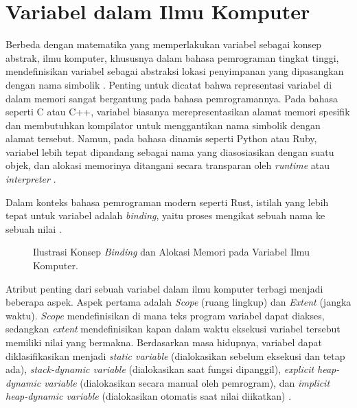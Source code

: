 \documentclass[11pt,a4paper]{article}
\begin{document}
\section{Variabel dalam Ilmu Komputer}

Berbeda dengan matematika yang memperlakukan variabel sebagai konsep abstrak, ilmu komputer, khususnya dalam bahasa pemrograman tingkat tinggi, mendefinisikan variabel sebagai abstraksi lokasi penyimpanan yang dipasangkan dengan nama simbolik \cite{brookshear, wikipedia_cs}. Penting untuk dicatat bahwa representasi variabel di dalam memori sangat bergantung pada bahasa pemrogramannya. Pada bahasa seperti C atau C++, variabel biasanya merepresentasikan alamat memori spesifik dan membutuhkan kompilator untuk menggantikan nama simbolik dengan alamat tersebut. Namun, pada bahasa dinamis seperti Python atau Ruby, variabel lebih tepat dipandang sebagai nama yang diasosiasikan dengan suatu objek, dan alokasi memorinya ditangani secara transparan oleh \textit{runtime} atau \textit{interpreter} \cite{wikipedia_cs}.

Dalam konteks bahasa pemrograman modern seperti Rust, istilah yang lebih tepat untuk variabel adalah \textit{binding}, yaitu proses mengikat sebuah nama ke sebuah nilai \cite{klabnik}.

\begin{figure}[htbp]
	\centering
	\caption{Ilustrasi Konsep \textit{Binding} dan Alokasi Memori pada Variabel Ilmu Komputer.}
	\label{fig:komputer_memori}
\end{figure}

Atribut penting dari sebuah variabel dalam ilmu komputer terbagi menjadi beberapa aspek. Aspek pertama adalah \textit{Scope} (ruang lingkup) dan \textit{Extent} (jangka waktu). \textit{Scope} mendefinisikan di mana teks program variabel dapat diakses, sedangkan \textit{extent} mendefinisikan kapan dalam waktu eksekusi variabel tersebut memiliki nilai yang bermakna. Berdasarkan masa hidupnya, variabel dapat diklasifikasikan menjadi \textit{static variable} (dialokasikan sebelum eksekusi dan tetap ada), \textit{stack-dynamic variable} (dialokasikan saat fungsi dipanggil), \textit{explicit heap-dynamic variable} (dialokasikan secara manual oleh pemrogram), dan \textit{implicit heap-dynamic variable} (dialokasikan otomatis saat nilai diikatkan) \cite{wikipedia_cs}.
\end{document}
